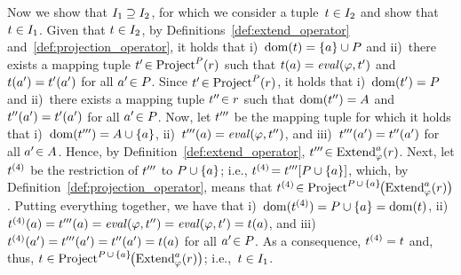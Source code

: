 	Now we show that $I_1 \supseteq I_2$, for which we consider a
	tuple~$t \in I_2$ and show that $t \in I_1$.
	Given that $t \in I_2$, by Definitions~\ref{def:extend_operator} and~\ref{def:projection_operator}, it holds that i)~$\mathrm{dom}(t)=\{a\} \cup P$ and ii)~there exists a mapping tuple $t'\! \in \text{Project}^{P}(r)$ such that $t(a) = \mathit{eval}(\varphi,t')$ and $t(a') = t'(a')$ for all $a'\! \in P$.
	Since $t'\! \in \text{Project}^{P}(r)$, it holds that i)~$\mathrm{dom}(t')=P$ and ii)~there exists a mapping tuple $t''\! \in r$ such that $\mathrm{dom}(t'') = A$ and $t''(a') = t'(a')$ for all $a'\! \in P$.
	Now, let $t'''$ be the mapping tuple for which it holds that i)~$\mathrm{dom}(t''') = A \cup \{a\}$, ii)~$t'''(a) = \mathit{eval}(\varphi,t'')$, and iii)~$t'''(a') = t''(a')$ for all $a'\! \in A$. Hence, by Definition~\ref{def:extend_operator}, $t'''\! \in \text{Extend}_{\varphi}^{a}(r)$.
	Next, let $t^{(4)}$ be the restriction of $t'''$ to $P \cup \{a\}$; i.e., $t^{(4)}\! = t'''[P \cup \{a\}]$, which, by Definition~\ref{def:projection_operator}, means that $t^{(4)}\! \in \text{Project}^{P \,\cup\, \{a\}\!}\bigl( \text{Extend}_{\varphi}^{a}(r) \bigr)$.
	Putting everything together, we have that i)~$\mathrm{dom}(t^{(4)}) = P \cup \{a\} = \mathrm{dom}(t)$, ii)~$t^{(4)}(a) = t'''(a) = \mathit{eval}(\varphi,t'') = \mathit{eval}(\varphi,t') = t(a)$, and iii)~$t^{(4)}(a') = t'''(a') = t''(a') = t(a)$ for all $a'\! \in P$. As a consequence, $t^{(4)} = t$ and, thus, $t \in \text{Project}^{P \,\cup\, \{a\}\!}\bigl( \text{Extend}_{\varphi}^{a}(r) \bigr)$; i.e.,~$t \in I_1$.
